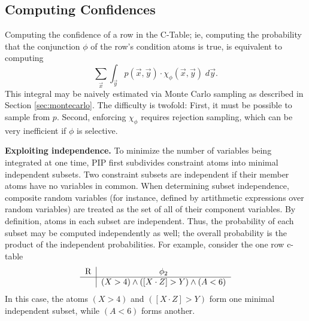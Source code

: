 \subsection{Computing Confidences}
\label{subsec:cint}


Computing the confidence of a row in the C-Table; ie, computing the 
probability that the conjunction $\phi$ of the row's condition atoms is true, 
is equivalent to computing
\[
\sum_{\vec{x}} \int_{\vec{y}} p(\vec{x}, \vec{y}) \cdot \chi_\phi(\vec{x},\vec{y}) \; d\vec{y}.
\]
This integral may be naively estimated via Monte Carlo sampling as
described in Section \ref{sec:montecarlo}.
The difficulty is twofold: First, it must be possible to sample from $p$.
Second, enforcing $\chi_\phi$ requires rejection sampling, which can be
very inefficient if $\phi$ is selective.






{\bf Exploiting independence.}
To minimize the number of variables being integrated at one time, PIP first subdivides constraint atoms into minimal independent subsets.  Two constraint subsets are independent if their member atoms have no variables in common.  When determining subset independence, composite random variables (for instance, defined by artithmetic expressions over random variables) are treated as the set of all of their component variables.  By definition, atoms in each subset are independent.  Thus, the probability of each subset may be computed independently as well; the overall probability is the product of the independent probabilities.  For example, consider the one row c-table 
\[
\begin{tabular}{c|c}
R & $\phi_2$ \\
\hline
& $(X > 4) \wedge ([X\cdot Z] > Y) \wedge (A < 6)$ \\
\end{tabular}
\]
In this case, the atoms $(X > 4)$ and $([X\cdot Z] > Y)$ form one minimal independent subset, while $(A < 6)$ forms another.


